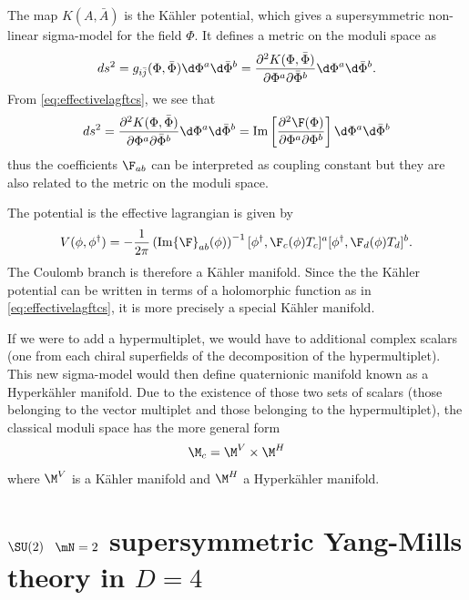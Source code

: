 \documentclass{worksheetclass}
\begin{document}
        The map $K(A,\bar{A})$ is the Kähler potential, which gives a supersymmetric non-linear sigma-model for the field $\Phi$. It defines a metric on the moduli space as
        \begin{equation}
            ds^2=g_{i\bar{j}}(\Phi,\bar{\Phi})\d\Phi^a\d\bar{\Phi}^b = \pdv{K(\Phi,\bar{\Phi})}{\Phi^a}{\bar{\Phi}^b}\d\Phi^a\d\bar{\Phi}^b.
        \end{equation}
        From \eqref{eq:effectivelagftcs}, we see that 
        \begin{equation}
            ds^2=\pdv{K(\Phi,\bar{\Phi})}{\Phi^a}{\bar{\Phi}^b}\d\Phi^a\d\bar{\Phi}^b = \Im\left[\pdv{\F(\Phi)}{\Phi^a}{\Phi^b}\right]\d\Phi^a\d\bar{\Phi}^b
        \end{equation}
        thus the coefficients $\F_{ab}$ can be interpreted as coupling constant but they are also related to the metric on the moduli space.

        The potential is the effective lagrangian is given by
        \begin{equation}
            V(\phi,\phi^\dagger)=-\frac{1}{2\pi}\left(\Im\F_{ab}(\phi)\right)^{-1}[\phi^\dagger,\F_c(\phi)T_c]^a[\phi^\dagger,\F_d(\phi)T_d]^b.
        \end{equation}
        The Coulomb branch is therefore a Kähler manifold. Since the the Kähler potential can be written in terms of a holomorphic function as in \eqref{eq:effectivelagftcs}, it is more precisely a special Kähler manifold.

        If we were to add a hypermultiplet, we would have to additional complex scalars (one from each chiral superfields of the decomposition of the hypermultiplet). This new sigma-model would then define quaternionic manifold known as a Hyperkähler manifold. Due to the existence of those two sets of scalars (those belonging to the vector multiplet and those belonging to the hypermultiplet), the classical moduli space has the more general form
        \begin{equation}
            \M_c=\M^V\times\M^H
        \end{equation}
        where $\M^V$ is a Kähler manifold and $\M^H$ a Hyperkähler manifold.


    \section{$\SU(2)$ $\mN=2$ supersymmetric Yang-Mills theory in $D=4$}

    
\end{document}
